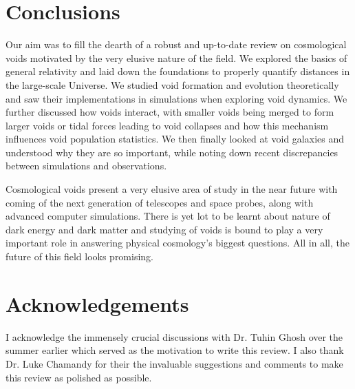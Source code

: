 \documentclass[fleqn,usenatbib]{mnras}
\begin{document}
\section{Conclusions}
Our aim was to fill the dearth of a robust and up-to-date review on cosmological voids motivated by the very elusive nature of the field. We explored the basics of general relativity and laid down the foundations to properly quantify distances in the large-scale Universe.  We studied void formation and evolution theoretically and saw their implementations in simulations when exploring void dynamics. We further discussed how voids interact, with smaller voids being merged to form larger voids or tidal forces leading to void collapses and how this mechanism influences void population statistics. We then finally looked at void galaxies and understood why they are so important, while noting down recent discrepancies between simulations and observations. 

Cosmological voids present a very elusive area of study in the near future with coming of the next generation of telescopes and space probes, along with advanced computer simulations. There is yet lot to be learnt about nature of dark energy and dark matter and studying of voids is bound to play a very important role in answering physical cosmology's biggest questions. All in all, the future of this field looks promising.
\section*{Acknowledgements}

I acknowledge the immensely crucial discussions with Dr. Tuhin Ghosh over the summer earlier which served as the motivation to write this review. I also thank Dr. Luke Chamandy for their the invaluable suggestions and comments to make this review as polished as possible. 

%
% 
\end{document}
